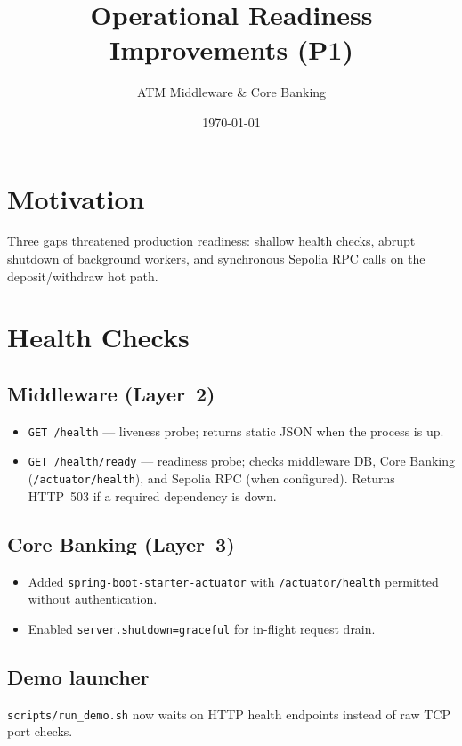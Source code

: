 \documentclass[11pt,a4paper]{article}
\title{Operational Readiness Improvements (P1)}
\author{ATM Middleware \& Core Banking}
\date{\today}
\begin{document}
\maketitle

\section{Motivation}
Three gaps threatened production readiness: shallow health checks, abrupt shutdown of background workers, and synchronous Sepolia RPC calls on the deposit/withdraw hot path.

\section{Health Checks}
\subsection{Middleware (Layer~2)}
\begin{itemize}[noitemsep]
  \item \texttt{GET /health} --- liveness probe; returns static JSON when the process is up.
  \item \texttt{GET /health/ready} --- readiness probe; checks middleware DB, Core Banking (\texttt{/actuator/health}), and Sepolia RPC (when configured). Returns HTTP~503 if a required dependency is down.
\end{itemize}

\subsection{Core Banking (Layer~3)}
\begin{itemize}[noitemsep]
  \item Added \texttt{spring-boot-starter-actuator} with \texttt{/actuator/health} permitted without authentication.
  \item Enabled \texttt{server.shutdown=graceful} for in-flight request drain.
\end{itemize}

\subsection{Demo launcher}
\texttt{scripts/run\_demo.sh} now waits on HTTP health endpoints instead of raw TCP port checks.
\end{document}
